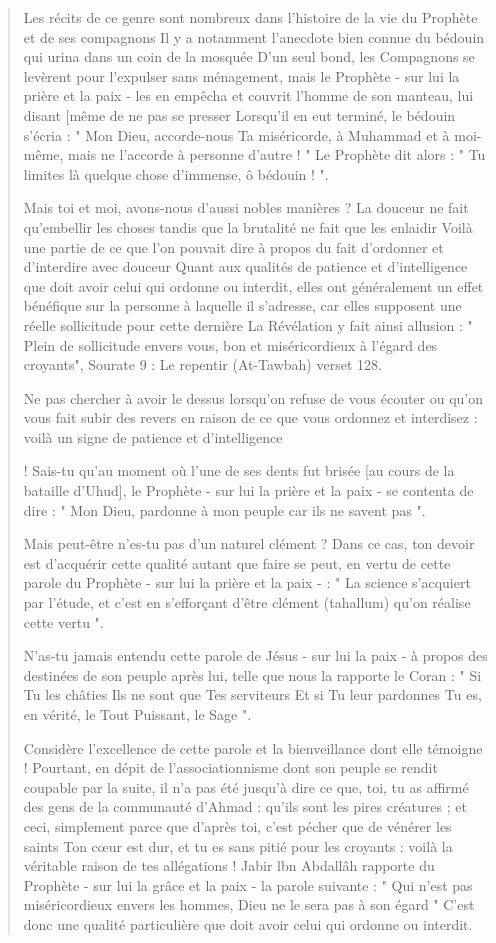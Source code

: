 \begin{quote}
Les récits de ce genre sont nombreux dans l'histoire de la vie du
Prophète et de ses compagnons Il y a notamment l'anecdote bien connue du
bédouin qui urina dans un coin de la mosquée D'un seul bond, les
Compagnons se levèrent pour l'expulser sans ménagement, mais le Prophète
- sur lui la prière et la paix - les en empêcha et couvrit l'homme de
son manteau, lui disant {[}même de ne pas se presser Lorsqu'il en eut
terminé, le bédouin s'écria : " Mon Dieu, accorde-nous Ta miséricorde, à
Muhammad et à moi- même, mais ne l'accorde à personne d'autre ! " Le
Prophète dit alors : " Tu limites là quelque chose d'immense, ô bédouin
! ".

Mais toi et moi, avons-nous d'aussi nobles manières ? La douceur ne fait
qu'embellir les choses tandis que la brutalité ne fait que les enlaidir
Voilà une partie de ce que l'on pouvait dire à propos du fait d'ordonner
et d'interdire avec douceur Quant aux qualités de patience et
d'intelligence que doit avoir celui qui ordonne ou interdit, elles ont
généralement un effet bénéfique sur la personne à laquelle il s'adresse,
car elles supposent une réelle sollicitude pour cette dernière La
Révélation y fait ainsi allusion : " Plein de sollicitude envers vous,
bon et miséricordieux à l'égard des croyants", Sourate 9 : Le repentir
(At-Tawbah) verset 128.

Ne pas chercher à avoir le dessus lorsqu'on refuse de vous écouter ou
qu'on vous fait subir des revers en raison de ce que vous ordonnez et
interdisez : voilà un signe de patience et d'intelligence

! Sais-tu qu'au moment où l'une de ses dents fut brisée {[}au cours de
la bataille d'Uhud{]}, le Prophète - sur lui la prière et la paix - se
contenta de dire : " Mon Dieu, pardonne à mon peuple car ils ne savent
pas ".

Mais peut-être n'es-tu pas d'un naturel clément ? Dans ce cas, ton
devoir est d'acquérir cette qualité autant que faire se peut, en vertu
de cette parole du Prophète - sur lui la prière et la paix - : " La
science s'acquiert par l'étude, et c'est en s'efforçant d'être clément
(tahallum) qu'on réalise cette vertu ".

N'as-tu jamais entendu cette parole de Jésus - sur lui la paix - à
propos des destinées de son peuple après lui, telle que nous la rapporte
le Coran : " Si Tu les châties Ils ne sont que Tes serviteurs Et si Tu
leur pardonnes Tu es, en vérité, le Tout Puissant, le Sage ".

Considère l'excellence de cette parole et la bienveillance dont elle
témoigne ! Pourtant, en dépit de l'associationnisme dont son peuple se
rendit coupable par la suite, il n'a pas été jusqu'à dire ce que, toi,
tu as affirmé des gens de la communauté d'Ahmad : qu'ils sont les pires
créatures ; et ceci, simplement parce que d'après toi, c'est pécher que
de vénérer les saints Ton cœur est dur, et tu es sans pitié pour les
croyants : voilà la véritable raison de tes allégations ! Jabir lbn
Abdallâh rapporte du Prophète - sur lui la grâce et la paix - la parole
suivante : " Qui n'est pas miséricordieux envers les hommes, Dieu ne le
sera pas à son égard " C'est donc une qualité particulière que doit
avoir celui qui ordonne ou interdit.


\end{quote}
